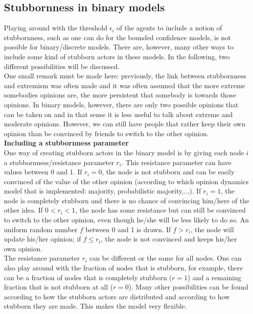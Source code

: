\documentclass[11 pt , letterpaper , twoside , openright]{book}
\begin{document}
\subsection{Stubbornness in binary models}
\label{stubbBin}

Playing around with the threshold $\epsilon_i$ of the agents to include a notion of stubbornness, such as one can do for the bounded confidence models, is not possible for binary/discrete models. There are, however, many other ways to include some kind of stubborn actors in these models. In the following, two different possibilities will be discussed. \\
\newline
One small remark must be made here: previously, the link between stubbornness and extremism was often made and it was often assumed that the more extreme somebodies opinions are, the more persistent that somebody is towards those opinions. In binary models, however, there are only two possible opinions that can be taken on and in that sense it is less useful to talk about extreme and moderate opinions. However, we can still have people that rather keep their own opinion than be convinced by friends to switch to the other opinion.\\
\newline
\textbf{Including a stubbornness parameter}\\
\newline
One way of creating stubborn actors in the binary model is by giving each node $i$ a stubbornness/resistance parameter $r_i$. This resistance parameter can have values between 0 and 1. If $r_i = 0$, the node is not stubborn and can be easily convinced of the value of the other opinion (according to which opinion dynamics model that is implemented: majority, probabilistic majority,...). If $r_i = 1$, the node is completely stubborn and there is no chance of convincing him/here of the other idea. If $0 < r_i < 1$, the node has some resistance but can still be convinced to switch to the other opinion, even though he/she will be less likely to do so. An uniform random number $f$ between 0 and 1 is drawn. If $f > r_i$, the node will update his/her opinion; if $f \leqslant r_i$, the node is not convinced and keeps his/her own opinion.\\
\newpage
\noindent
The resistance parameter $r_i$ can be different or the same for all nodes. One can also play around with the fraction of nodes that is stubborn, for example, there can be a fraction of nodes that is completely stubborn ($r = 1$) and a remaining fraction that is not stubborn at all ($r = 0$). Many other possibilities can be found according to how the stubborn actors are distributed and according to how stubborn they are made. This makes the model very flexible.\\
\end{document}

